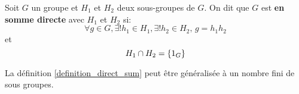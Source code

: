 \begin{definition}
	\label{definition_direct_sum}
	Soit $G$ un groupe et $H_{1}$ et $H_{2}$ deux sous-groupes de $G$.
	On dit que $G$ est \textbf{en somme directe} avec $H_{1}$ et $H_{2}$ si:
	\begin{equation}
		\forall g \in G, \exists! h_{1} \in H_{1}, \exists!h_{2} \in H_{2}, \,
		g = h_{1}h_{2}
	\end{equation}
	et
	\begin{equation}
		H_{1} \cap H_{2} = \left\{ 1_{G} \right\}
	\end{equation}
\end{definition}

La définition \ref{definition_direct_sum} peut être généralisée à un nombre fini
de sous groupes.
